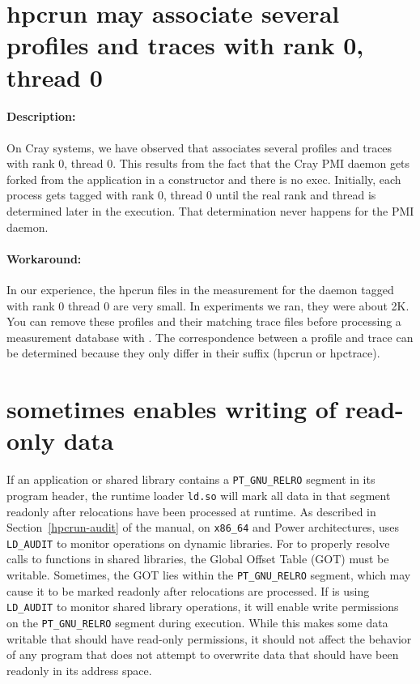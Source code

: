 \documentclass[11pt,twoside,letterpaper]{report}
\begin{document}
\section{hpcrun{} may associate several profiles and traces with rank 0, thread 0}

\paragraph{Description:}  On Cray systems, we have observed that \hpcrun{} associates several profiles and traces with rank 0, thread 0. This results from the fact that the Cray PMI daemon gets forked from the application in a constructor and there is no exec. Initially, each process gets tagged with rank 0, thread 0 until the real rank and thread is determined later in the execution. That determination never happens for the PMI daemon.

\paragraph{Workaround:} In our experience, the hpcrun files in the measurement for the daemon tagged with rank 0 thread 0 are very small. In experiments we ran, they were about 2K. You can remove these profiles and their matching trace files before processing a measurement database with \hpcprof{}. The correspondence between a profile and trace can be determined because they only differ in their suffix (hpcrun or hpctrace).

\section{\hpcrun{} sometimes enables writing of read-only data}

If an application or shared library contains a \verb|PT_GNU_RELRO| segment in its program header, the runtime loader \verb|ld.so| will mark all data in that segment readonly
after relocations have been processed at runtime.
As described in Section~\ref{hpcrun-audit} of the manual, on \verb|x86_64| and Power architectures, \hpcrun{} uses \verb|LD_AUDIT| to monitor operations on dynamic libraries.
For \hpcrun{} to properly resolve calls to functions in shared libraries, the Global Offset Table (GOT) must be writable. Sometimes, the GOT lies within the \verb|PT_GNU_RELRO| segment, which may cause it to be marked readonly after relocations are processed.
If \hpcrun{} is using   \verb|LD_AUDIT| to monitor shared library operations, it will enable write permissions on the \verb|PT_GNU_RELRO| segment during execution. While this makes some data writable that should have read-only permissions, it should not affect the behavior of any program that does not attempt to overwrite data that should have been readonly in its address space.
\end{document}

